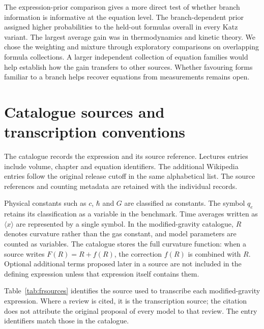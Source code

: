 \documentclass[10pt]{article}
\begin{document}
The expression-prior comparison gives a more direct test of whether branch information is informative at the equation level. The branch-dependent prior assigned higher probabilities to the held-out formulas overall in every Katz variant. The largest average gain was in thermodynamics and kinetic theory. We chose the weighting and mixture through exploratory comparisons on overlapping formula collections. A larger independent collection of equation families would help establish how the gain transfers to other sources. Whether favouring forms familiar to a branch helps recover equations from measurements remains open.


\begingroup
\setlength{\bibsep}{2pt plus 1pt}

\endgroup

\clearpage
\appendix
\section{Catalogue sources and transcription conventions}\label{app:catalogue}
The catalogue records the expression and its source reference. Lectures entries include volume, chapter and equation identifiers. The additional Wikipedia entries follow the original release cutoff in the same alphabetical list. The source references and counting metadata are retained with the individual records.

Physical constants such as $c$, $\hbar$ and $G$ are classified as constants. The symbol $q_e$ retains its classification as a variable in the benchmark. Time averages written as $\langle x\rangle$ are represented by a single symbol. In the modified-gravity catalogue, $R$ denotes curvature rather than the gas constant, and model parameters are counted as variables. The catalogue stores the full curvature function: when a source writes $F(R)=R+f(R)$, the correction $f(R)$ is combined with $R$. Optional additional terms proposed later in a source are not included in the defining expression unless that expression itself contains them.

Table~\ref{tab:frsources} identifies the source used to transcribe each modified-gravity expression. Where a review is cited, it is the transcription source; the citation does not attribute the original proposal of every model to that review. The entry identifiers match those in the catalogue.
\end{document}
